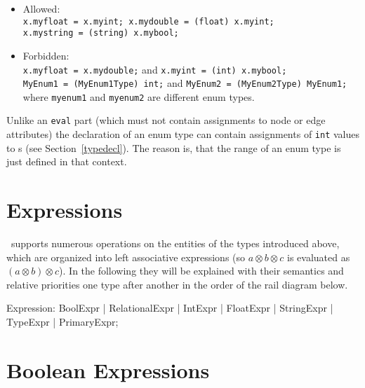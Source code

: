 \begin{example}
  \begin{itemize}
    \item Allowed:\\
	  \texttt{x.myfloat = x.myint; x.mydouble = (float) x.myint;\\ x.mystring = (string) x.mybool;}
    \item Forbidden:\\
      \texttt{x.myfloat = x.mydouble;} and \texttt{x.myint = (int) x.mybool;}\\
      \texttt{MyEnum1 = (MyEnum1Type) int;} and \texttt{MyEnum2 = (MyEnum2Type) MyEnum1;}
  where {\tt myenum1} and {\tt myenum2} are different enum types.

  \end{itemize}
\end{example}

\begin{note}
	Unlike an {\tt eval} part (which must not contain assignments to node or edge attributes) the declaration of an enum type can contain assignments of {\tt int} values to s (see Section~\ref{typedecl}).
	The reason is, that the range of an enum type is just defined in that context.
\end{note}


\section{Expressions}\label{sub:expr}

\GrG~supports numerous operations on the entities of the types introduced above, which are organized into left associative expressions (so $a \otimes b \otimes c$ is evaluated as $(a \otimes b) \otimes c$).
In the following they will be explained with their semantics and relative priorities one type after another in the order of the rail diagram below.

\begin{rail}
  Expression: BoolExpr | RelationalExpr | IntExpr | FloatExpr | StringExpr | TypeExpr | PrimaryExpr;
\end{rail}


\section{Boolean Expressions}

